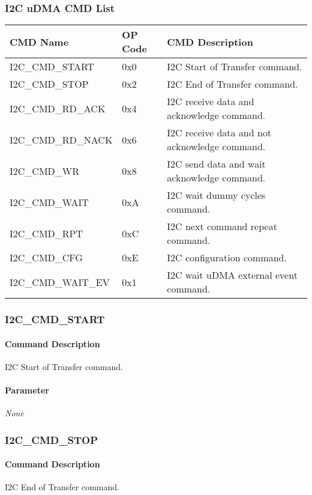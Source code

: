 \subsubsection{I2C uDMA CMD List}
{\small
\begin{tabularx}{\textwidth}{|l|l|l|}
  \hline
  \textbf{CMD Name} & \textbf{OP Code}  & \textbf{CMD Description} \\
  \hline
  I2C\_CMD\_START    & 0x0 & I2C Start of Transfer command.               \\
  I2C\_CMD\_STOP     & 0x2 & I2C End of Transfer command.                 \\
  I2C\_CMD\_RD\_ACK   & 0x4 & I2C receive data and acknowledge command.    \\
  I2C\_CMD\_RD\_NACK  & 0x6 & I2C receive data and not acknowledge command.\\
  I2C\_CMD\_WR       & 0x8 & I2C send data and wait acknowledge command.  \\
  I2C\_CMD\_WAIT     & 0xA & I2C wait dummy cycles command.               \\
  I2C\_CMD\_RPT      & 0xC & I2C next command repeat command.             \\
  I2C\_CMD\_CFG      & 0xE & I2C configuration command.                   \\
  I2C\_CMD\_WAIT\_EV & 0x1 & I2C wait uDMA external event command.        \\
  \hline
\end{tabularx}
}

\subsubsection{I2C\_CMD\_START}
\paragraph{Command Description}
I2C Start of Transfer command.
\paragraph{Parameter}
\textit{None}

\subsubsection{I2C\_CMD\_STOP}
\paragraph{Command Description}
I2C End of Transfer command.
